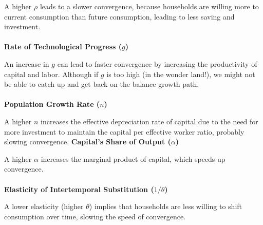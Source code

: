 \documentclass[12pt]{extarticle}
\begin{document}
A higher \( \rho \) leads to a slower convergence, because households are willing more to current consumption than future consumption,
leading to less saving and investment.\\\\
\textbf{Rate of Technological Progress (\( g \))}

An increase in \( g \) can lead to faster convergence by increasing the productivity of capital and labor. Although if $g$ is too high (in the wonder land!),
we might not be able to catch up and get back on the balance growth path.\\\\
\textbf{Population Growth Rate (\( n \))}

A higher \( n \) increases the effective depreciation rate of capital due to the need for more investment to maintain the capital per effective worker ratio,
probably slowing convergence.
\textbf{Capital's Share of Output (\( \alpha \))}

A higher \( \alpha \) increases the marginal product of capital,
which speeds up convergence.\\\\
\textbf{Elasticity of Intertemporal Substitution (\( 1/\theta \))}

A lower elasticity (higher \( \theta \)) implies that households are less willing to shift consumption over time,
slowing the speed of convergence.\\\\
\end{document}
